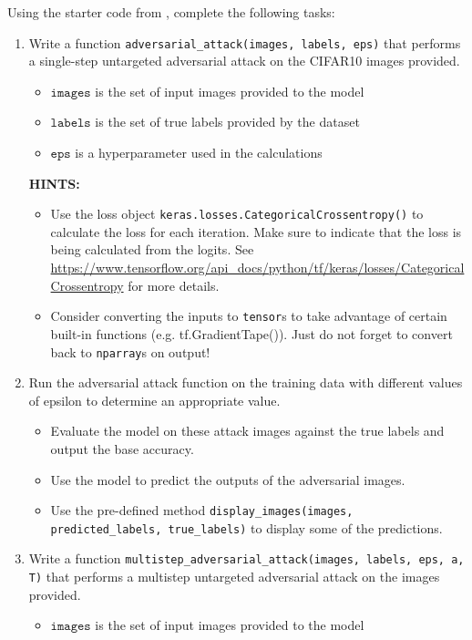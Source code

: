\documentclass{article}
\begin{document}
Using the starter code from , complete the following tasks:
\begin{enumerate}
    \item Write a function \texttt{adversarial\_attack(images, labels, eps)} that performs a single-step untargeted adversarial attack on the CIFAR10 images provided.
    \begin{itemize}
        \item $\texttt{images}$ is the set of input images provided to the model
        \item $\texttt{labels}$ is the set of true labels provided by the dataset
        \item $\texttt{eps}$ is a hyperparameter used in the calculations
    \end{itemize}
    \textbf{HINTS:}
    \begin{itemize}
        \item Use the loss object \texttt{keras.losses.CategoricalCrossentropy()} to calculate the loss for each iteration. Make sure to indicate that the loss is being calculated from the logits. See \url{https://www.tensorflow.org/api_docs/python/tf/keras/losses/CategoricalCrossentropy} for more details.
        \item Consider converting the inputs to \texttt{tensor}s to take advantage of certain built-in functions (e.g. tf.GradientTape()). Just do not forget to convert back to \texttt{nparray}s on output!
    \end{itemize}
    \item Run the adversarial attack function on the training data with different values of epsilon to determine an appropriate value.
    \begin{itemize}
        \item Evaluate the model on these attack images against the true labels and output the base accuracy. 
        \item Use the model to predict the outputs of the adversarial images.
        \item Use the pre-defined method \texttt{display\_images(images, predicted\_labels, true\_labels)} to display some of the predictions.
    \end{itemize}
    \item Write a function \texttt{multistep\_adversarial\_attack(images, labels, eps, a, T)} that performs a multistep untargeted adversarial attack on the images provided.
    \begin{itemize}
        \item $\texttt{images}$ is the set of input images provided to the model

\end{itemize}
\end{enumerate}
\end{document}
